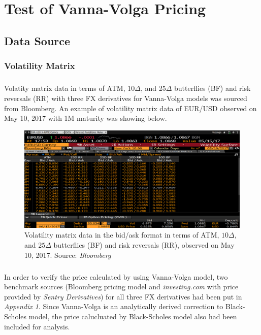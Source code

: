 \chapter{Test of Vanna-Volga Pricing}


\section{Data Source}
\subsection{Volatility Matrix}
\paragraph{}
Volatity matrix data in terms of ATM, $10\Delta$, and 25$\Delta$ butterflies (BF) and risk reversals (RR) with three FX derivatives for Vanna-Volga models was sourced from Bloomberg. An example of volatility matrix data of EUR/USD observed on May 10, 2017 with 1M maturity was showing below.

\begin{figure}[htb]
	\centering
	\includegraphics[scale=0.3]{./Testing-data/EURUSD.png} 
	\caption{Volatility matrix data in the bid/ask format in terms of ATM, $10\Delta$, and $25\Delta$ butterflies (BF) and risk reversals (RR), observed on May 10, 2017. Source: \textit{Bloomberg}}
	\label{fig:label} %
\end{figure}
\paragraph{}
In order to verify the price calculated by using Vanna-Volga model, two benchmark sources (Bloomberg pricing model and \textit{investing.com} with price provided by \textit{Sentry Derivatives}) for all three FX derivatives had been put in \textit{Appendix 1}. Since Vanna-Volga is an analytically derived correction to Black-Scholes model, the price calucluated by Black-Scholes model also had been included for analysis.

